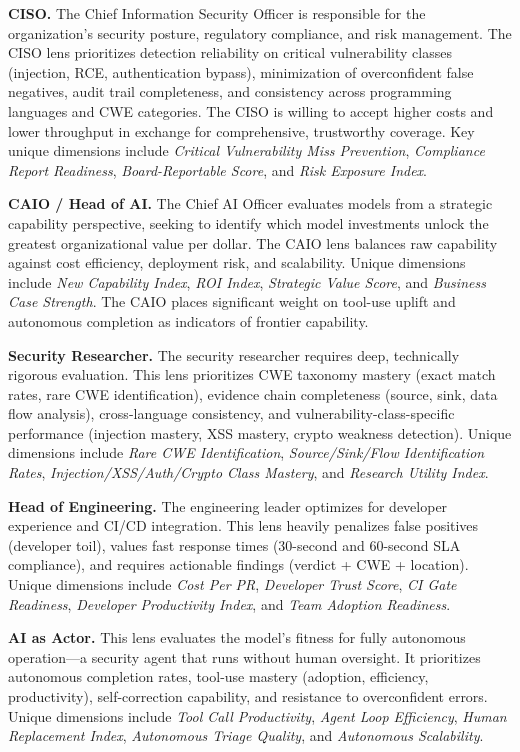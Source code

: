 \documentclass[10pt,twocolumn]{article}
\begin{document}
\textbf{CISO.} The Chief Information Security Officer is responsible for the organization's security posture, regulatory compliance, and risk management. The CISO lens prioritizes detection reliability on critical vulnerability classes (injection, RCE, authentication bypass), minimization of overconfident false negatives, audit trail completeness, and consistency across programming languages and CWE categories. The CISO is willing to accept higher costs and lower throughput in exchange for comprehensive, trustworthy coverage. Key unique dimensions include \emph{Critical Vulnerability Miss Prevention}, \emph{Compliance Report Readiness}, \emph{Board-Reportable Score}, and \emph{Risk Exposure Index}.

\textbf{CAIO / Head of AI.} The Chief AI Officer evaluates models from a strategic capability perspective, seeking to identify which model investments unlock the greatest organizational value per dollar. The CAIO lens balances raw capability against cost efficiency, deployment risk, and scalability. Unique dimensions include \emph{New Capability Index}, \emph{ROI Index}, \emph{Strategic Value Score}, and \emph{Business Case Strength}. The CAIO places significant weight on tool-use uplift and autonomous completion as indicators of frontier capability.

\textbf{Security Researcher.} The security researcher requires deep, technically rigorous evaluation. This lens prioritizes CWE taxonomy mastery (exact match rates, rare CWE identification), evidence chain completeness (source, sink, data flow analysis), cross-language consistency, and vulnerability-class-specific performance (injection mastery, XSS mastery, crypto weakness detection). Unique dimensions include \emph{Rare CWE Identification}, \emph{Source/Sink/Flow Identification Rates}, \emph{Injection/XSS/Auth/Crypto Class Mastery}, and \emph{Research Utility Index}.

\textbf{Head of Engineering.} The engineering leader optimizes for developer experience and CI/CD integration. This lens heavily penalizes false positives (developer toil), values fast response times (30-second and 60-second SLA compliance), and requires actionable findings (verdict + CWE + location). Unique dimensions include \emph{Cost Per PR}, \emph{Developer Trust Score}, \emph{CI Gate Readiness}, \emph{Developer Productivity Index}, and \emph{Team Adoption Readiness}.

\textbf{AI as Actor.} This lens evaluates the model's fitness for fully autonomous operation---a security agent that runs without human oversight. It prioritizes autonomous completion rates, tool-use mastery (adoption, efficiency, productivity), self-correction capability, and resistance to overconfident errors. Unique dimensions include \emph{Tool Call Productivity}, \emph{Agent Loop Efficiency}, \emph{Human Replacement Index}, \emph{Autonomous Triage Quality}, and \emph{Autonomous Scalability}.
\end{document}
